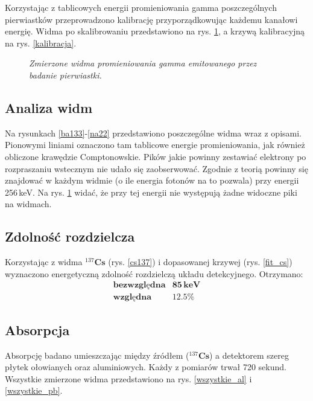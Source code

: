 \documentclass[10pt, twocolumn]{article}
\begin{document}
Korzystając z tablicowych \cite{NuclearDataCenter} energii promieniowania gamma poszczególnych pierwiastków przeprowadzono kalibrację przyporządkowując każdemu kanałowi energię. Widma po skalibrowaniu przedstawiono na rys. \ref{widma}, a krzywą kalibracyjną na rys. \ref{kalibracja}.

\begin{figure}
  \caption{\em Zmierzone widma promieniowania gamma emitowanego przez badanie pierwiastki.}
  \label{widma}
\end{figure}

\subsection*{Analiza widm}
Na rysunkach \ref{ba133}-\ref{na22} przedstawiono poszczególne widma wraz z opisami. Pionowymi liniami oznaczono tam tablicowe energie promieniowania, jak również obliczone krawędzie Comptonowskie. Pików jakie powinny zestawiać elektrony po rozpraszaniu wstecznym nie udało się zaobserwować. Zgodnie z teorią powinny się znajdować w każdym widmie (o ile energia fotonów na to pozwala) przy energii 256$\,$keV. Na rys. \ref{widma} widać, że przy tej energii nie występują żadne widoczne piki na widmach.

\subsection*{Zdolność rozdzielcza}
Korzystając z widma $^{137}\mathbf{Cs}$ (rys. \ref{cs137}) i dopasowanej krzywej (rys. \ref{fit_cs}) wyznaczono energetyczną zdolność rozdzielczą układu detekcyjnego. Otrzymano:
\begin{equation*}
  \begin{array}{ll}
    \textbf{bezwzględna} & \mathbf{85\,keV} \\
    \textbf{względna} & \mathbf{12.5 \%}
  \end{array}
\end{equation*}


\subsection*{Absorpcja}
Absorpcję badano umieszczając między źródłem ($^{137}\mathbf{Cs}$) a detektorem szereg płytek ołowianych oraz aluminiowych. Każdy z pomiarów trwał 720 sekund. Wszystkie zmierzone widma przedstawiono na rys. \ref{wszystkie_al} i \ref{wszystkie_pb}.
\end{document}
